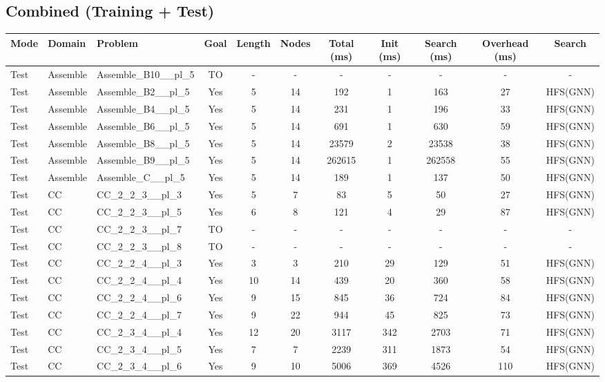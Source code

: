 \documentclass{article}
\begin{document}
\subsection*{Combined (Training + Test)}
\begin{tabular}{lllcccccccc}
\toprule
Mode & Domain & Problem & Goal & Length & Nodes & Total (ms) & Init (ms) & Search (ms) & Overhead (ms) & Search \\
\midrule
Test & Assemble & Assemble\_B10\_\_pl\_5 & TO & - & - & - & - & - & - & - \\
Test & Assemble & Assemble\_B2\_\_pl\_5 & Yes & 5 & 14 & 192 & 1 & 163 & 27 & HFS(GNN) \\
Test & Assemble & Assemble\_B4\_\_pl\_5 & Yes & 5 & 14 & 231 & 1 & 196 & 33 & HFS(GNN) \\
Test & Assemble & Assemble\_B6\_\_pl\_5 & Yes & 5 & 14 & 691 & 1 & 630 & 59 & HFS(GNN) \\
Test & Assemble & Assemble\_B8\_\_pl\_5 & Yes & 5 & 14 & 23579 & 2 & 23538 & 38 & HFS(GNN) \\
Test & Assemble & Assemble\_B9\_\_pl\_5 & Yes & 5 & 14 & 262615 & 1 & 262558 & 55 & HFS(GNN) \\
Test & Assemble & Assemble\_C\_\_pl\_5 & Yes & 5 & 14 & 189 & 1 & 137 & 50 & HFS(GNN) \\
Test & CC & CC\_2\_2\_3\_\_pl\_3 & Yes & 5 & 7 & 83 & 5 & 50 & 27 & HFS(GNN) \\
Test & CC & CC\_2\_2\_3\_\_pl\_5 & Yes & 6 & 8 & 121 & 4 & 29 & 87 & HFS(GNN) \\
Test & CC & CC\_2\_2\_3\_\_pl\_7 & TO & - & - & - & - & - & - & - \\
Test & CC & CC\_2\_2\_3\_\_pl\_8 & TO & - & - & - & - & - & - & - \\
Test & CC & CC\_2\_2\_4\_\_pl\_3 & Yes & 3 & 3 & 210 & 29 & 129 & 51 & HFS(GNN) \\
Test & CC & CC\_2\_2\_4\_\_pl\_4 & Yes & 10 & 14 & 439 & 20 & 360 & 58 & HFS(GNN) \\
Test & CC & CC\_2\_2\_4\_\_pl\_6 & Yes & 9 & 15 & 845 & 36 & 724 & 84 & HFS(GNN) \\
Test & CC & CC\_2\_2\_4\_\_pl\_7 & Yes & 9 & 22 & 944 & 45 & 825 & 73 & HFS(GNN) \\
Test & CC & CC\_2\_3\_4\_\_pl\_4 & Yes & 12 & 20 & 3117 & 342 & 2703 & 71 & HFS(GNN) \\
Test & CC & CC\_2\_3\_4\_\_pl\_5 & Yes & 7 & 7 & 2239 & 311 & 1873 & 54 & HFS(GNN) \\
Test & CC & CC\_2\_3\_4\_\_pl\_6 & Yes & 9 & 10 & 5006 & 369 & 4526 & 110 & HFS(GNN) \\

\end{tabular}
\end{document}
